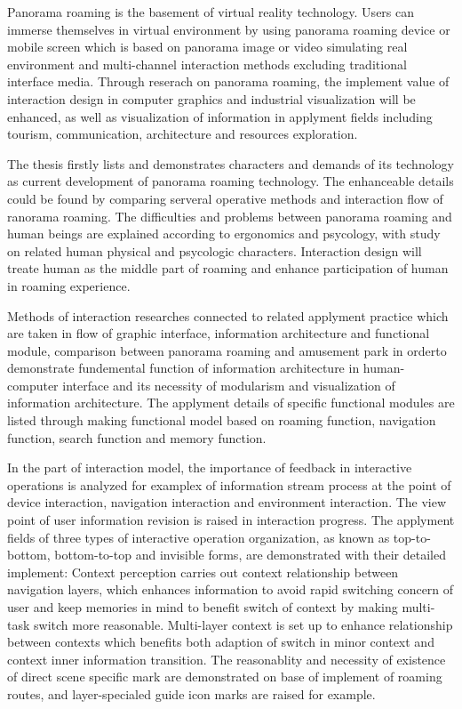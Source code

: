 \begin{enabstract}
\begin{spacing}{1.0}
Panorama roaming is the basement of virtual reality technology. Users can immerse themselves in virtual environment by using panorama roaming device or mobile screen which is based on panorama image or video simulating real environment and multi-channel interaction methods excluding traditional interface media. Through reserach on panorama roaming, the implement value of interaction design in computer graphics and industrial visualization will be enhanced, as well as visualization of information in applyment fields including tourism, communication, architecture and resources exploration.

The thesis firstly lists and demonstrates characters and demands of its technology as current development of panorama roaming technology. The enhanceable details could be found by comparing serveral operative methods and interaction flow of ranorama roaming. The difficulties and problems between panorama roaming and human beings are explained according to ergonomics and psycology, with study on related human physical and psycologic characters. Interaction design will treate human as the middle part of roaming and enhance participation of human in roaming experience.

Methods of interaction researches connected to related applyment practice which are taken in flow of graphic interface, information architecture and functional module, comparison between panorama roaming and amusement park in orderto demonstrate fundemental function 
of information architecture in human-computer interface and its necessity of modularism and visualization of information architecture. The applyment details of specific functional modules are listed through making functional model based on roaming function, navigation function, search function and memory function.

In the part of interaction model, the importance of feedback in interactive operations is analyzed for examplex of information stream process at the point of device interaction, navigation interaction and environment interaction. The view point of user information revision is raised in interaction progress. The applyment fields of three types of interactive operation organization, as known as top-to-bottom, bottom-to-top and invisible forms, are demonstrated with their detailed implement: Context perception carries out context relationship between navigation layers, which enhances information to avoid rapid switching concern of user and keep memories in mind to benefit switch of context by making multi-task switch more reasonable. Multi-layer context is set up to enhance relationship between contexts which benefits both adaption of switch in minor context and context inner information transition. The reasonablity and necessity of existence of direct scene specific mark are demonstrated on base of implement of roaming routes, and layer-specialed guide icon marks are raised for example.


\end{spacing}
\end{enabstract}
